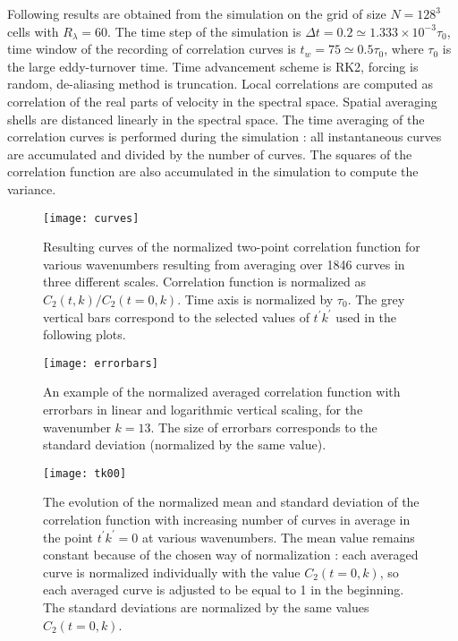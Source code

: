 \documentclass[landscape, 12pt,a4paper,notitlepage]{report}
\begin{document}
	\par Following results are obtained from the simulation on the grid of size $N=128^3$ cells with $R_\lambda = 60$. The time step of the simulation is $\Delta t = 0.2 \simeq 1.333 \times 10^{-3} \tau_0$, time window of the recording of correlation curves is $t_w = 75 \simeq 0.5 \tau_0 $, where $\tau_0$ is the large eddy-turnover time. Time advancement scheme is RK2, forcing is random, de-aliasing method is truncation. Local correlations are computed as correlation of the real parts of velocity in the spectral space. Spatial averaging shells are distanced linearly in the spectral space. The time averaging of the correlation curves is performed during the simulation : all instantaneous curves are accumulated and divided by the number of curves. The squares of the correlation function are also accumulated in the simulation to compute the variance.
\begin{figure}[hh]
	\centering
	\texttt{[image: curves]} \\
	\caption[.]{Resulting curves of the normalized two-point correlation function for various wavenumbers resulting from averaging over 1846 curves in three different scales. Correlation function is normalized as $C_2(t, k) / C_2(t=0, k)$. Time axis is normalized by $\tau_0$. The grey vertical bars correspond to the selected values of $t^\prime k^\prime$ used in the following plots.}
\end{figure}
\newpage
\begin{figure}
	\centering
	\texttt{[image: errorbars]} \\
	\caption[.]{An example of the normalized averaged correlation function with errorbars in linear and logarithmic vertical scaling, for the wavenumber $k=13$. The size of errorbars corresponds to the standard deviation (normalized by the same value).}
\end{figure}
\newpage
\begin{figure}
	\centering
	\texttt{[image: tk00]} \\
	\caption[.]{The evolution of the normalized mean and standard deviation of the correlation function with increasing number of curves in average in the point $t^\prime k^\prime =0$ at various wavenumbers. The mean value remains constant because of the chosen way of normalization : each averaged curve is normalized individually with the value $C_2(t = 0, k)$, so each averaged curve is adjusted to be equal to 1 in the beginning. The standard deviations are normalized by the same values $C_2(t = 0, k)$.} 
\end{figure}
\end{document}

